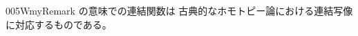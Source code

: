 \documentclass[index]{subfiles}
\begin{document}
\begin{myBlock}{005W}{myRemark}
  の意味での連結関数は
  古典的なホモトピー論における連結写像に対応するものである。
\end{myBlock}
\end{document}
